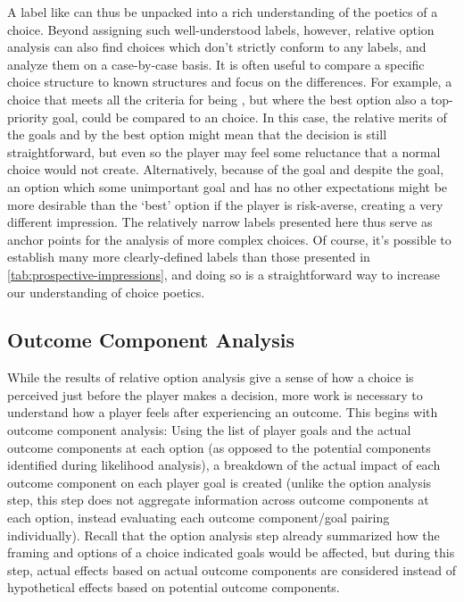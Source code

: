 A label like  can thus be unpacked into a rich understanding of the poetics of a choice.
%
Beyond assigning such well-understood labels, however, relative option analysis can also find choices which don't strictly conform to any labels, and analyze them on a case-by-case basis.
%
It is often useful to compare a specific choice structure to known structures and focus on the differences.
%
For example, a choice that meets all the criteria for being , but where the best option also  a top-priority goal, could be compared to an  choice.
%
In this case, the relative merits of the goals  and  by the best option might mean that the decision is still straightforward, but even so the player may feel some reluctance that a normal  choice would not create.
%
Alternatively, because of the  goal and despite the  goal, an option which  some unimportant goal and has no other expectations might be more desirable than the `best' option if the player is risk-averse, creating a very different impression.
%
The relatively narrow labels presented here thus serve as anchor points for the analysis of more complex choices.
%
Of course, it's possible to establish many more clearly-defined labels than those presented in \cref{tab:prospective-impressions}, and doing so is a straightforward way to increase our understanding of choice poetics.


\subsection{Outcome Component Analysis}

\label{sec:cp-outcome-component-analysis}

While the results of relative option analysis give a sense of how a choice is perceived just before the player makes a decision, more work is necessary to understand how a player feels after experiencing an outcome.
%
This begins with outcome component analysis: Using the list of player goals and the actual outcome components at each option (as opposed to the potential components identified during likelihood analysis), a breakdown of the actual impact of each outcome component on each player goal is created (unlike the option analysis step, this step does not aggregate information across outcome components at each option, instead evaluating each outcome component/goal pairing individually).
%
Recall that the option analysis step already summarized how the framing and options of a choice indicated goals would be affected, but during this step, actual effects based on actual outcome components are considered instead of hypothetical effects based on potential outcome components.


